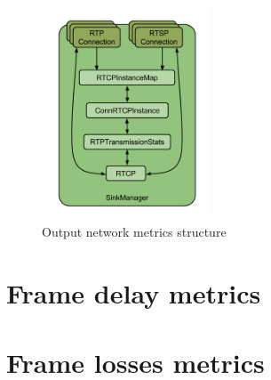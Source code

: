 \begin{figure}[!htb]
\begin{center}
\includegraphics[width=0.45\textwidth]{./images/SinkManager.png}
\caption{Output network metrics structure}
\label{F:onms}
\end{center}
\end{figure}


\section{Frame delay metrics}

\section{Frame losses metrics}
